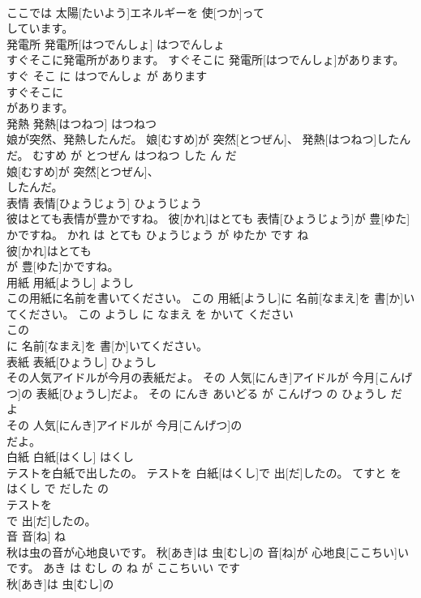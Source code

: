 \documentclass[8pt]{extreport}
\begin{document}
\begin{CJK}{UTF8}{min}
\\	ここでは 太陽[たいよう]エネルギーを 使[つか]って
\\	しています。			
\\	発電所	発電所[はつでんしょ]	はつでんしょ	
\\	すぐそこに発電所があります。	すぐそこに 発電所[はつでんしょ]があります。	すぐ そこ に はつでんしょ が あります	
\\	すぐそこに
\\	があります。			
\\	発熱	発熱[はつねつ]	はつねつ	
\\	娘が突然、発熱したんだ。	娘[むすめ]が 突然[とつぜん]、 発熱[はつねつ]したんだ。	むすめ が とつぜん はつねつ した ん だ	
\\	娘[むすめ]が 突然[とつぜん]、
\\	したんだ。			
\\	表情	表情[ひょうじょう]	ひょうじょう	
\\	彼はとても表情が豊かですね。	彼[かれ]はとても 表情[ひょうじょう]が 豊[ゆた]かですね。	かれ は とても ひょうじょう が ゆたか です ね	
\\	彼[かれ]はとても
\\	が 豊[ゆた]かですね。			
\\	用紙	用紙[ようし]	ようし	
\\	この用紙に名前を書いてください。	この 用紙[ようし]に 名前[なまえ]を 書[か]いてください。	この ようし に なまえ を かいて ください	
\\	この
\\	に 名前[なまえ]を 書[か]いてください。			
\\	表紙	表紙[ひょうし]	ひょうし	
\\	その人気アイドルが今月の表紙だよ。	その 人気[にんき]アイドルが 今月[こんげつ]の 表紙[ひょうし]だよ。	その にんき あいどる が こんげつ の ひょうし だ よ	
\\	その 人気[にんき]アイドルが 今月[こんげつ]の
\\	だよ。			
\\	白紙	白紙[はくし]	はくし	
\\	テストを白紙で出したの。	テストを 白紙[はくし]で 出[だ]したの。	てすと を はくし で だした の	
\\	テストを
\\	で 出[だ]したの。			
\\	音	音[ね]	ね	
\\	秋は虫の音が心地良いです。	秋[あき]は 虫[むし]の 音[ね]が 心地良[ここちい]いです。	あき は むし の ね が ここちいい です	
\\	秋[あき]は 虫[むし]の

\end{CJK}
\end{document}
